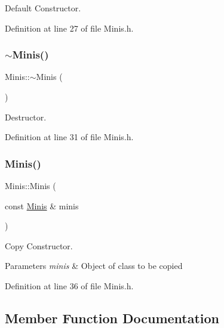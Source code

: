 Default Constructor. 



Definition at line 27 of file Minis.\+h.

\hypertarget{class_minis_a0ce29fd41f5c3f412401128a9dc7dc3b}{}\label{class_minis_a0ce29fd41f5c3f412401128a9dc7dc3b} 
\subsubsection{\texorpdfstring{$\sim$\+Minis()}{~Minis()}}
{\footnotesize\ttfamily Minis\+::$\sim$\+Minis (\begin{DoxyParamCaption}{ }\end{DoxyParamCaption})\hspace{0.3cm}{\ttfamily [inline]}}



Destructor. 



Definition at line 31 of file Minis.\+h.

\hypertarget{class_minis_a8f19940186bb60864cbf4b2a50a62f44}{}\label{class_minis_a8f19940186bb60864cbf4b2a50a62f44} 
\subsubsection{\texorpdfstring{Minis()}{Minis()}\hspace{0.1cm}{\footnotesize\ttfamily [2/2]}}
{\footnotesize\ttfamily Minis\+::\+Minis (\begin{DoxyParamCaption}\item[{const \hyperlink{class_minis}{Minis} \&}]{minis }\end{DoxyParamCaption})\hspace{0.3cm}{\ttfamily [inline]}}



Copy Constructor. 


\begin{DoxyParams}{Parameters}
{\em minis} & Object of class to be copied \\
\hline
\end{DoxyParams}


Definition at line 36 of file Minis.\+h.



\subsection{Member Function Documentation}
\hypertarget{class_minis_a75f45698aaf057d11e083694bfd31d17}{}\label{class_minis_a75f45698aaf057d11e083694bfd31d17} 
